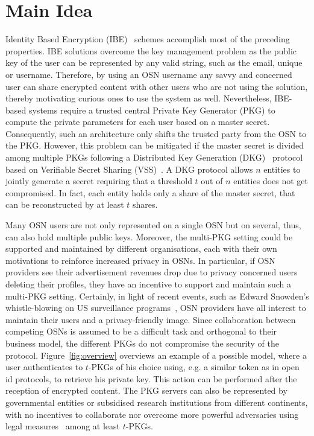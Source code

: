 \section{Main Idea}
Identity Based Encryption (IBE)~\cite{art:Shamir84} schemes accomplish most of the preceding properties. IBE solutions overcome the key management problem as the public key of the user can be represented by any valid string, such as the email, unique \id{} or username. Therefore, by using an OSN username any savvy and concerned user can share encrypted content with other users who are not using the solution, thereby motivating curious ones to use the system as well. Nevertheless, IBE-based systems require a trusted central Private Key Generator (PKG) to compute the private parameters for each user based on a master secret. Consequently, such an architecture only shifts the trusted party from the OSN to the PKG. However, this problem can be mitigated if the master secret is divided among multiple PKGs following a Distributed Key Generation (DKG)~\cite{art:Pedersen91a} protocol based on Verifiable Secret Sharing (VSS)~\cite{art:ChorGMA85}. A DKG protocol allows $n$ entities to jointly generate a secret requiring that a threshold $t$ out of $n$ entities does not get compromised. In fact, each entity holds only a share of the master secret, that can be reconstructed by at least $t$ shares. 

Many OSN users are not only represented on a single OSN but on several, thus, can also hold multiple public keys. Moreover, the multi-PKG setting could be supported and maintained by different organisations, each with their own motivations to reinforce increased privacy in OSNs. In particular, if OSN providers see their advertisement revenues drop due to privacy concerned users deleting their profiles, they have an incentive to support and maintain such a multi-PKG setting. Certainly, in light of recent events, such as Edward Snowden's whistle-blowing on US surveillance programs~\cite{prism}, OSN providers have all interest to maintain their users and a privacy-friendly image. Since collaboration between competing OSNs is assumed to be a difficult task and orthogonal to their business model, the different PKGs do not compromise the security of the protocol. Figure~\ref{fig:overview} overviews an example of a possible model, where a user authenticates to $t$-PKGs of his choice using, e.g. a similar token as in open id protocols, to retrieve his private key. This action can be performed after the reception of encrypted content. The PKG servers can also be represented by governmental entities or subsidised research institutions from different continents, with no incentives to collaborate nor overcome more powerful adversaries using legal measures~\cite{art:Matyszcyk12} among at least $t$-PKGs. 

